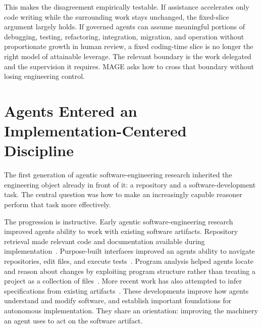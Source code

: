 This makes the disagreement empirically testable. If assistance accelerates only code writing while the surrounding work stays unchanged, the fixed-slice argument largely holds. If governed agents can assume meaningful portions of debugging, testing, refactoring, integration, migration, and operation without proportionate growth in human review, a fixed coding-time slice is no longer the right model of attainable leverage. The relevant boundary is the work delegated and the supervision it requires. MAGE asks how to cross that boundary without losing engineering control.

\section{Agents Entered an Implementation-Centered Discipline}\label{heading:agents-entered-an-implementation-centered-discipline}


The first generation of agentic software-engineering research inherited the engineering object already in front of it: a repository and a software-development task. The central question was how to make an increasingly capable reasoner perform that task more effectively.


The progression is instructive. Early agentic software-engineering research improved agents\textquotesingle{} ability to work with existing software artifacts. Repository retrieval made relevant code and documentation available during implementation~\citep{zhang2023repocoder}. Purpose-built interfaces improved an agent\textquotesingle s ability to navigate repositories, edit files, and execute tests~\citep{yang2024sweagent}. Program analysis helped agents locate and reason about changes by exploiting program structure rather than treating a project as a collection of files~\citep{zhang2024autocoderover}. More recent work has also attempted to infer specifications from existing artifacts~\citep{ruan2025specrover}. These developments improve how agents understand and modify software, and establish important foundations for autonomous implementation. They share an orientation: improving the machinery an agent uses to act on the software artifact.

